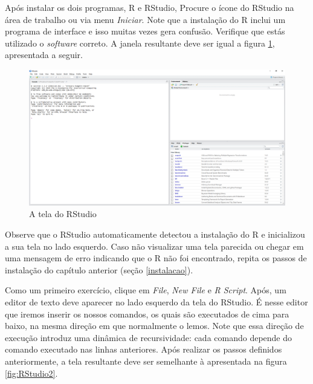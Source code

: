 \documentclass[
  11pt,
]{book}
\begin{document}
Após instalar os dois programas, R e RStudio, Procure o ícone do RStudio na área de trabalho ou via menu \emph{Iniciar}. Note que a instalação do R inclui um programa de interface e isso muitas vezes gera confusão. Verifique que estás utilizado o \emph{software} correto. A janela resultante deve ser igual a figura \ref{fig:RStudio1}, apresentada a seguir.

\begin{figure}[!htbp]

{\centering \includegraphics[width=1\linewidth]{00-text-resources/figs/RStudio1} 

}

\caption{A tela do RStudio}\label{fig:RStudio1}
\end{figure}

Observe que o RStudio automaticamente detectou a instalação do R e inicializou a sua tela no lado esquerdo. Caso não visualizar uma tela parecida ou chegar em uma mensagem de erro indicando que o R não foi encontrado, repita os passos de instalação do capítulo anterior (seção \ref{instalacao}).

Como um primeiro exercício, clique em \emph{File}, \emph{New File} e \emph{R Script}. Após, um editor de texto deve aparecer no lado esquerdo da tela do RStudio. É nesse editor que iremos inserir os nossos comandos, os quais são executados de cima para baixo, na mesma direção em que normalmente o lemos. Note que essa direção de execução introduz uma dinâmica de recursividade: cada comando depende do comando executado nas linhas anteriores. Após realizar os passos definidos anteriormente, a tela resultante deve ser semelhante à apresentada na figura \ref{fig:RStudio2}.
\end{document}
